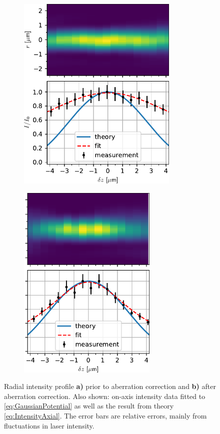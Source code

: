 \begin{figure}[t]
\centering
	\begin{subfigure}{.49\textwidth}
	    \flushleft
		\includegraphics[height=9.5cm]{figures/AxialScanUncorrected.pdf}
		\caption{}
		\label{fig:AxialUncorrected}
	\end{subfigure}
	\begin{subfigure}{.49\textwidth}
		\flushright
		\includegraphics[height=9.5cm]{figures/AxialScanCorrected.pdf}
		\caption{}
		\label{fig:AxialZernike}
	\end{subfigure}
	\caption{Radial intensity profile \textsf{\textbf{a)}} prior to aberration correction and \textsf{\textbf{b)}} after aberration correction.
	Also shown: on-axis intensity data fitted to \cref{eq:GaussianPotential} as well as the result from theory \cref{eq:IntensityAxial}.
	The error bars are relative errors, mainly from fluctuations in laser intensity.}
	\label{fig:AxialScans}
\end{figure}

